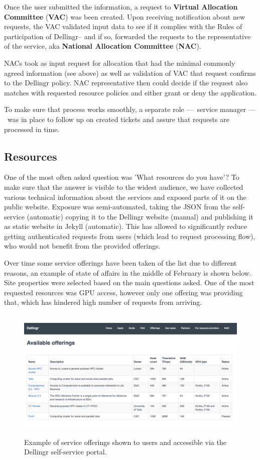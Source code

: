\documentclass{article}
\newcommand{\dell}{Dellingr\xspace}
\begin{document}
Once the user submitted the information, a request to \textbf{Virtual Allocation Committee} (\textbf{VAC}) was been created. 
Upon receiving notification about new requests, the VAC validated input data to see if it complies with the Rules of participation of \dell -- and if so, forwarded the requests to the representative of the service, aka \textbf{National Allocation Committee} (\textbf{NAC}).

NACs took as input request for allocation that had the minimal commonly agreed information (see above) as well as validation of VAC that request confirms to the \dell policy. NAC representative then could decide if the request also matches with requested resource policies and either grant or deny the application. 

To make sure that process works smoothly, a separate role –– service manager –– was in place to follow up on created tickets and assure that requests are processed in time.

\subsection{Resources}

One of the most often asked question was 'What resources do you have'? To make sure that the answer is visible to the widest audience, we have collected various technical information about the services and exposed parts of it on the public website. Exposure was semi-automated, taking the JSON from the self-service (automatic) copying it to the \dell website (manual) and publishing it as static website in Jekyll (automatic). This has allowed to significantly reduce getting authenticated requests from users (which lead to request processing flow), who would not benefit from the provided offerings.  

Over time some service offerings have been taken of the list due to different reasons, an example of state of affairs in the middle of February is shown below. Site properties were selected based on the main questions asked. One of the most requested resources was GPU access, however only one offering was providing that, which has hindered high number of requests from arriving.


\begin{figure}
\centering
\includegraphics[height=180pt]{Dellingr-list-of-resource.png}
\caption{Example of service offerings shown to users and accessible via the \dell self-service portal.}
\end{figure}
\end{document}
